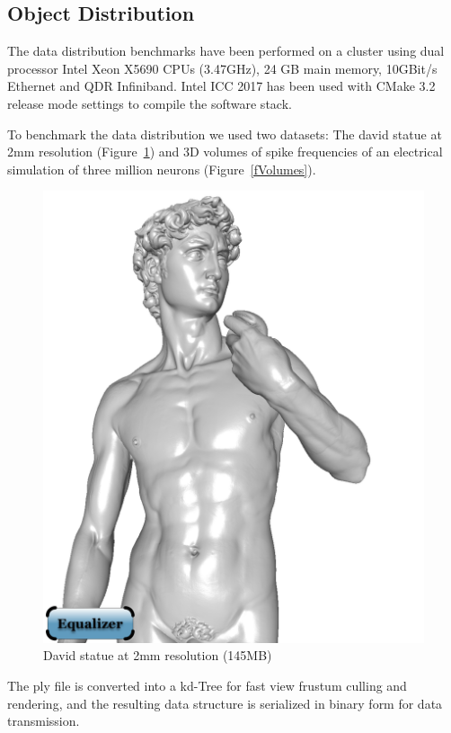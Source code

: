 \documentclass[10pt,journal,compsoc]{IEEEtran}
\newcommand{\fig}[1]{Figure~\ref{#1}}
\begin{document}
\subsection{Object Distribution}

The data distribution benchmarks have been performed on a cluster using
dual processor Intel Xeon X5690 CPUs (3.47GHz), 24 GB main memory, 10GBit/s
Ethernet and QDR Infiniband. Intel ICC 2017 has been used with CMake 3.2 release
mode settings to compile the software stack.

To benchmark the data distribution we used two datasets: The david statue at 2mm
resolution (\fig{fDavid2mm}) and 3D volumes of spike frequencies of an
electrical simulation of three million neurons (\fig{fVolumes}).

\begin{figure}[ht]\center
  \includegraphics[width=.49\columnwidth]{images/david2mm}
  \caption{\label{fDavid2mm}David statue at 2mm resolution (145MB)}
\end{figure}

The ply file is converted into a kd-Tree for fast view frustum culling and
rendering, and the resulting data structure is serialized in binary form for
data transmission.
\end{document}
